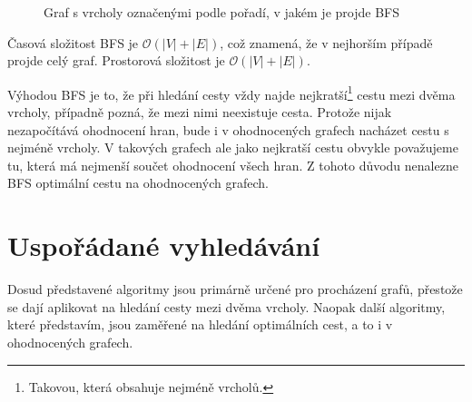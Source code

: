 \documentclass[12pt]{report}			%
\begin{document}
\begin{figure}[h]
\begin{center}
\caption{Graf s vrcholy označenými podle pořadí, v jakém je projde BFS} \label{grafBFS}
\end{center}
\end{figure}
Časová složitost BFS je $\mathcal{O}(|V| + |E|)$, což znamená, že v nejhorším případě projde celý graf. Prostorová složitost je $\mathcal{O}(|V| + |E|)$.

Výhodou BFS je to, že při hledání cesty vždy najde nejkratší\footnote{Takovou, která obsahuje nejméně vrcholů.} cestu mezi dvěma vrcholy, případně pozná, že mezi nimi neexistuje cesta. Protože nijak nezapočítává ohodnocení hran, bude i v ohodnocených grafech nacházet cestu s nejméně vrcholy. V takových grafech ale jako nejkratší cestu obvykle považujeme tu, která má nejmenší součet ohodnocení všech hran. Z tohoto důvodu nenalezne BFS optimální cestu na ohodnocených grafech.

		
			\section{Uspořádané vyhledávání}
			Dosud představené algoritmy jsou primárně určené pro procházení grafů, přestože se dají aplikovat na hledání cesty mezi dvěma vrcholy.
			Naopak další algoritmy, které představím, jsou zaměřené na hledání optimálních cest, a to i v ohodnocených grafech.
			
			
\end{document}
